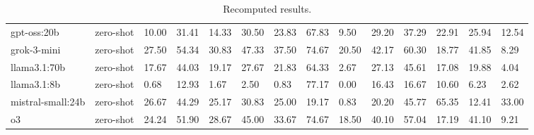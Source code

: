 \begin{table}[!t]
\begin{tabular}{llllllllllllll}
gpt-oss:20b & zero-shot & 10.00 & 31.41 & 14.33 & 30.50 & 23.83 & 67.83 & 9.50 & 29.20 & 37.29 & 22.91 & 25.94 & 12.54 \\
grok-3-mini & zero-shot & 27.50 & 54.34 & 30.83 & 47.33 & 37.50 & 74.67 & 20.50 & 42.17 & 60.30 & 18.77 & 41.85 & 8.29 \\
llama3.1:70b & zero-shot & 17.67 & 44.03 & 19.17 & 27.67 & 21.83 & 64.33 & 2.67 & 27.13 & 45.61 & 17.08 & 19.88 & 4.04 \\
llama3.1:8b & zero-shot & 0.68 & 12.93 & 1.67 & 2.50 & 0.83 & 77.17 & 0.00 & 16.43 & 16.67 & 10.60 & 6.23 & 2.62 \\
mistral-small:24b & zero-shot & 26.67 & 44.29 & 25.17 & 30.83 & 25.00 & 19.17 & 0.83 & 20.20 & 45.77 & 65.35 & 12.41 & 33.00 \\
o3 & zero-shot & 24.24 & 51.90 & 28.67 & 45.00 & 33.67 & 74.67 & 18.50 & 40.10 & 57.04 & 17.19 & 41.10 & 9.21 \\
\bottomrule
\end{tabular}
\caption{Recomputed results.}
\label{tab:consistency_per_action_by_id}
\end{table}
